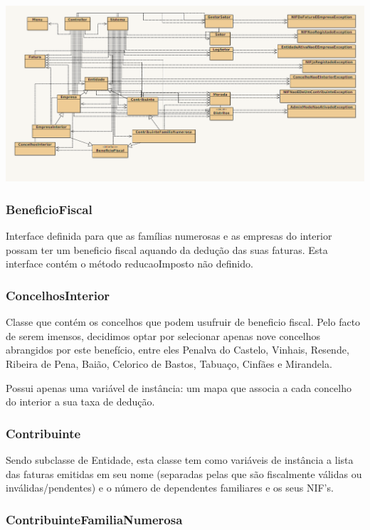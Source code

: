\documentclass[a4paper]{article}
\begin{document}
  \includegraphics[width=1.0\linewidth]{classes.png}
	
\subsubsection{BeneficioFiscal} %


Interface definida para que as famílias numerosas e as empresas do interior
possam ter um beneficio fiscal aquando da dedução das suas faturas.
Esta interface contém o método reducaoImposto não definido.


\subsubsection{ConcelhosInterior} %

Classe que contém os concelhos que podem usufruir de beneficio fiscal. Pelo facto de serem imensos, decidimos optar por selecionar apenas nove concelhos abrangidos por este benefício, entre eles Penalva do Castelo, Vinhais, Resende, Ribeira de Pena, Baião, Celorico de Bastos, Tabuaço, Cinfães e Mirandela.

Possui apenas uma variável de instância: um mapa que associa a cada concelho do interior a sua taxa de dedução.


\subsubsection{Contribuinte} %

Sendo subclasse de Entidade, esta classe tem como variáveis de instância a lista das faturas emitidas em seu nome (separadas pelas que são 
fiscalmente válidas ou inválidas/pendentes) e o número de dependentes familiares e os seus NIF's.


\subsubsection{ContribuinteFamiliaNumerosa} %
\end{document}
